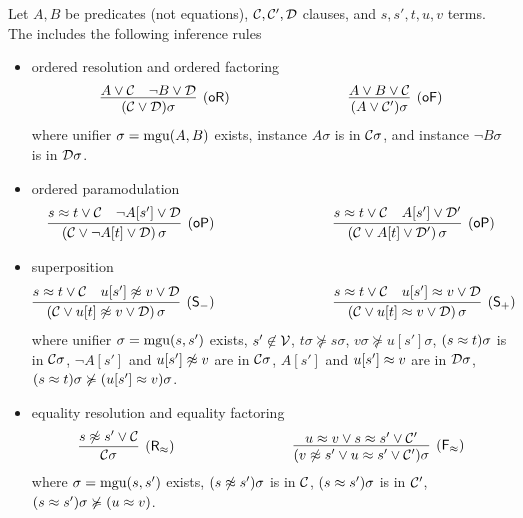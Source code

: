 
\begin{definition}\label{def:superposition-calculus}
	Let \( A,B \) be predicates (not equations),
	\( \mathcal{C},\mathcal{C}',\mathcal{D} \) clauses, and \( s,s', t,u,v \) terms.
	The  includes the following inference rules
	\begin{itemize}
		\item ordered resolution and ordered factoring
		\begin{gather*}
		\infer
		[\mathsf{(oR)}]
		{(\mcC \lor \mcD)\sigma}
		{{ A} \lor\mcC & { \lnot B} \lor\mcD}
		\hspace{3cm}
		\infer
		[\mathsf{(oF)}]
		{(A \lor \mcC')\sigma}
		{{ A}\lor B\lor\mcC}
		\end{gather*}
		where unifier \( \sigma=\operatorname{mgu}(A,B) \) exists,
		instance \( A\sigma \) is \txtSTRICTLY{} in \( \mathcal{C} \sigma \),
		and	instance \( \lnot B\sigma \) is \txtMAXIMAL{} in \( \mathcal{D}\sigma \).
		\item ordered paramodulation
		\begin{gather*}
		\infer
		[\mathsf{(oP)}]
		{(\mcC\lor \lnot A[t]\lor\mcD)\,\sigma}
		{{ s\mEQ t} \lor\mcC\quad { \lnot A[s']}\lor\mcD}
		\hspace{3cm}
		\infer
		[\mathsf{(oP)}]
		{(\mcC\lor A[t]\lor\mcD')\,\sigma}
		{{ s\mEQ t} \lor\mcC\quad { A[s']}\lor\mcD'}
\end{gather*}
\item superposition
\begin{gather*}
		\infer
		[\mathsf{(S_-)}]
		{(\mcC\lor u[t]\mNE v\lor\mcD)\,\sigma}
		{{ s\mEQ t}\lor\mcC\quad { u[s']\mNE v}\lor\mcD}
		\hspace{3cm}
		\infer
		[\mathsf{(S_+)}]
		{(\mcC\lor u[t]\mEQ v\lor\mcD)\,\sigma}
		{{ s\mEQ t}\lor\mcC\quad { u[s']\mEQ v}\lor\mcD}
		\end{gather*}
		where unifier \( \sigma=\operatorname{mgu}(s,s') \) exists,
		\( s'\not\in\mathcal{V} \),
		\( t\sigma\not\succcurlyeq s\sigma \),
		\( v\sigma\not\succcurlyeq u[s']\sigma \),
		\( (s\approx t)\sigma \) is \txtSTRICTLY{} in \( \mathcal{C}\sigma \),
		\( \lnot A[s'] \) and \( u[s']\not\approx v \) are \txtMAXIMAL{} in \( \mathcal{C}\sigma \),
		\( A[s'] \) and \( u[s']\approx v \) are \txtSTRICTLY{} in \( \mathcal{D}\sigma \),
		\( (s\approx t)\sigma\not\succcurlyeq(u[s']\approx v)\sigma \).
		\item
		equality resolution and equality factoring
		\[
		\infer
		[\mathsf{(R_\mEQ)}]
		{\mcC\sigma}
		{{s\mNE s'}\lor\mcC}
		\hspace{3cm}
		\infer
		[\mathsf{(F_\mEQ)}]
		{(v\mNE s'\lor u\mEQ s'\lor\mcC')\sigma}
		{{ u\mEQ v}\lor{s\mEQ s'}\lor\mcC'}
		\]
		where
		\( \sigma=\operatorname{mgu}(s,s') \) exists,
		\( (s\not\approx s')\sigma \) is \txtMAXIMAL{} in \( \mathcal{C} \),
		\( (s\approx s')\sigma \) is \txtSTRICTLY{} in \( \mathcal{C}' \),
		\( (s\approx s')\sigma\not\succcurlyeq(u\approx v) \).
	\end{itemize}
\end{definition}
